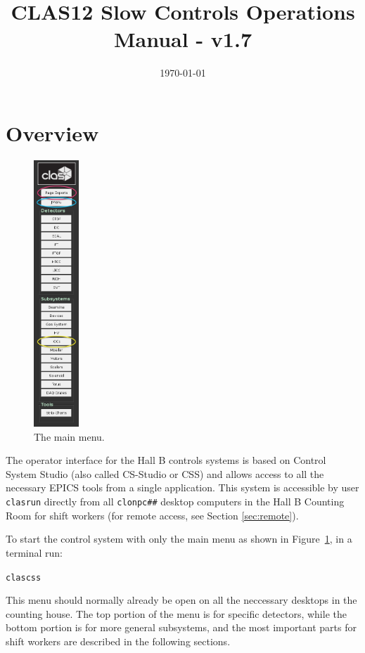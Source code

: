 \documentclass[amsmath,amssymb,notitlepage,11pt]{revtex4}
\begin{document}
\title{CLAS12 Slow Controls Operations Manual - v1.7}
\date{\today}
\begin{abstract}
\end{abstract}

\maketitle

\section{Overview}

\begin{figure}\centering\vspace{1cm}
  \includegraphics[width=0.15\textwidth]{pics/mainmenu}
  \caption{The main menu.\label{fig:mainmenu}}
\end{figure}

The operator interface for the Hall B controls systems is based on Control System Studio (also called CS-Studio or CSS) and allows access to all the necessary EPICS tools from a single application.  This system is accessible by user \texttt{clasrun} directly from all \texttt{clonpc\#\#} desktop computers in the Hall B Counting Room for shift workers (for remote access, see Section \ref{sec:remote}).


To start the control system with only the main menu as shown in Figure~\ref{fig:mainmenu}, in a terminal run: \begin{center}\texttt{clascss}\end{center}  This menu should normally already be open on all the neccessary desktops in the counting house.  The top portion of the menu is for specific detectors, while the bottom portion is for more general subsystems, and the most important parts for shift workers are described in the following sections.
\end{document}
